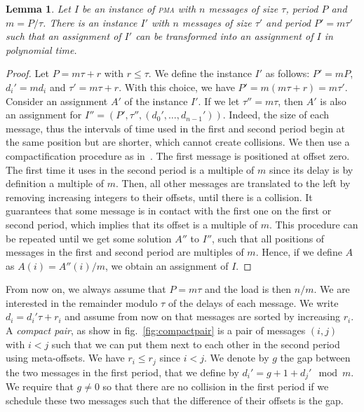 \documentclass[10pt, conference, letterpaper]{IEEEtran}
\newtheorem{lemma}[theorem]{Lemma}
\newcommand\pma{\textsc{pma}\xspace}
\begin{document}
\begin{lemma}
Let $I$ be an instance of \pma with $n$ messages of size $\tau$, period $P$ and $m = P / \tau$. There is an instance $I'$ with $n$ messages of size $\tau'$ and period $P'= m\tau'$ such that an assignment of $I'$ can be transformed into an assignment of $I$ in polynomial time.
\end{lemma}
\begin{proof}
Let $P = m \tau + r$ with $r \leq \tau$. We define the instance $I'$ as follows: $P' = mP$, $d_{i}' = m d_i$ and $\tau' = m \tau + r$. With this choice, we have $P' = m(m \tau + r) = m \tau'$.
Consider an assignment $A'$ of the instance $I'$.
If we let $\tau'' = m\tau$, then $A'$ is also an assignment for $I'' = (P',\tau'',(d_{0}',\dots,d_{n-1}'))$. Indeed, the size of each message, thus the intervals of time used in the first and second period begin at the same position but are shorter, which cannot create collisions.
We then use a compactification procedure as in~\cite{barth2018deterministic}. The first message is positioned at offset zero. The first time it uses in the second period is a multiple of $m$ since its delay is by definition a multiple of $m$. Then, all other messages are translated to the left by removing increasing integers to their offsets, until there is a collision. It guarantees that some message is in contact with the first one on the first or second period,  which implies that its offset is a multiple of $m$. This procedure can be repeated until we get some solution $A''$ to $I''$, such that all positions of messages in the first and second period are multiples of $m$. Hence, if we define $A$ as $A(i) = A''(i)/m$, we obtain an assignment of $I$.
\end{proof}

From now on, we always assume that $P = m\tau$ and the load is then $n/m$.
We are interested in the remainder modulo $\tau$ of the delays of each message.
We write $d_i = d_{i}'\tau + r_i$ and assume from now on that messages are sorted by increasing $r_i$.
A \emph{compact pair}, as show in fig.~\ref{fig:compactpair} is a pair of messages $(i,j)$ with $i < j$ such that we can put them
next to each other in the second period using meta-offsets.
We have $r_i \leq r_j$ since $i < j$. We denote by $g$ the gap between the two messages in the first period, that we define by $d_{i}' = g + 1 + d_{j}' \mod m$. We require that $g \neq 0$ so that there are no collision in the first period if we schedule these two messages such that the difference of their offsets is the gap. 
\end{document}
